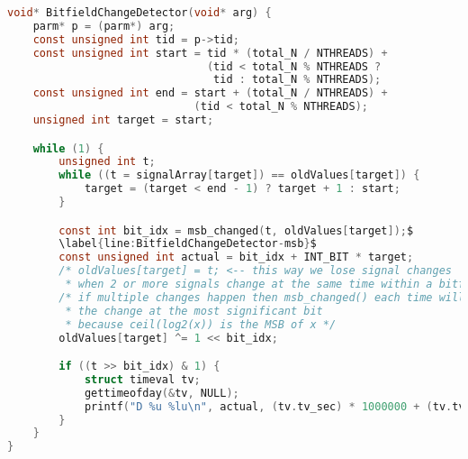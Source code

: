 \begin{lstlisting}[language=c, caption={BitfieldChangeDetector()}, escapechar=$]
void* BitfieldChangeDetector(void* arg) {
    parm* p = (parm*) arg;
    const unsigned int tid = p->tid;
    const unsigned int start = tid * (total_N / NTHREADS) +
                               (tid < total_N % NTHREADS ?
                                tid : total_N % NTHREADS);
    const unsigned int end = start + (total_N / NTHREADS) +
                             (tid < total_N % NTHREADS);
    unsigned int target = start;

    while (1) {
        unsigned int t;
        while ((t = signalArray[target]) == oldValues[target]) {
            target = (target < end - 1) ? target + 1 : start;
        }

        const int bit_idx = msb_changed(t, oldValues[target]);$
        \label{line:BitfieldChangeDetector-msb}$
        const unsigned int actual = bit_idx + INT_BIT * target;
        /* oldValues[target] = t; <-- this way we lose signal changes
         * when 2 or more signals change at the same time within a bitfield. */
        /* if multiple changes happen then msb_changed() each time will find
         * the change at the most significant bit
         * because ceil(log2(x)) is the MSB of x */
        oldValues[target] ^= 1 << bit_idx;

        if ((t >> bit_idx) & 1) {
            struct timeval tv;
            gettimeofday(&tv, NULL);
            printf("D %u %lu\n", actual, (tv.tv_sec) * 1000000 + (tv.tv_usec));
        }
    }
}
\end{lstlisting}


